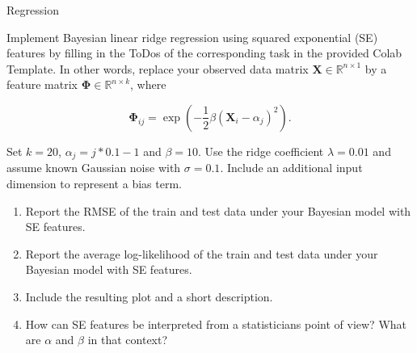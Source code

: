 \documentclass[
	english,
        solution=true
	]{tudaexercise}
\begin{document}
\begin{task}[points=34]{Regression}
\begin{subtask}[points=10, title=Bayesian Linear Regression]
        \begin{solution}

        \end{solution}
    \end{subtask}

    \begin{subtask}[points=8, title=Squared Exponential Features]
        Implement Bayesian linear ridge regression using squared exponential (SE) features by filling in the ToDos of the corresponding task in the provided Colab Template.
        In other words, replace your observed data matrix $\mathbf{X} \in \mathbb{R}^{n \times 1}$ by a feature matrix $\bm{\Phi} \in \mathbb{R}^{n \times k}$, where

        \begin{equation*}
            \bm{\Phi}_{ij} = \exp \left( -\frac{1}{2} \beta (\mathbf{X}_i - \alpha_j)^2 \right).
        \end{equation*}

        Set $k = 20$, $\alpha_j = j * 0.1 - 1$ and $\beta = 10$. Use the ridge coefficient $\lambda = 0.01$ and assume known Gaussian noise with $\sigma = 0.1$.
        Include an additional input dimension to represent a bias term.

        \begin{enumerate}
            \item Report the RMSE of the train and test data under your Bayesian model with SE features. 
            \item Report the average log-likelihood of the train and test data under your Bayesian model with SE features. 
            \item Include the resulting plot and a short description. 
            \item How can SE features be interpreted from a statisticians point of view? What are $\alpha$ and $\beta$ in that context? 
        \end{enumerate}

        \begin{solution}

        \end{solution}
    \end{subtask}
\end{task}

\newpage
\end{document}
